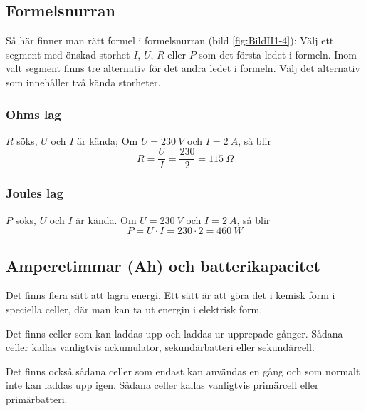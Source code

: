 \subsection{Formelsnurran}
\frdjp


Så här finner man rätt formel i formelsnurran (bild \ref{fig:BildII1-4}):
Välj ett segment med önskad storhet \(I\), \(U\), \(R\) eller \(P\) som det
första ledet i formeln.
Inom valt segment finns tre alternativ för det andra ledet i formeln.
Välj det alternativ som innehåller två kända storheter.


\subsubsection{Ohms lag}

\(R\) söks, \(U\) och \(I\) är kända;
Om \(U = 230\ V\) och \(I = 2\ A\), så blir
\[R=\dfrac{U}{I}=\dfrac{230}{2}=115\ \Omega\]
\subsubsection{Joules lag}

\(P\) söks, \(U\) och \(I\) är kända.
Om \(U = 230\ V\) och \(I = 2\ A\), så blir
\[P = U \cdot I = 230 \cdot 2 = 460\ W\]
\subsection{Amperetimmar (Ah) och batterikapacitet}

Det finns flera sätt att lagra energi.
Ett sätt är att göra det i kemisk form i speciella celler, där man kan ta ut
energin i elektrisk form.

Det finns celler som kan laddas upp och laddas ur upprepade gånger.
Sådana celler kallas vanligtvis ackumulator, sekundärbatteri eller
sekundärcell.

Det finns också sådana celler som endast kan användas en gång och som normalt
inte kan laddas upp igen.
Sådana celler kallas vanligtvis primärcell eller primärbatteri.

